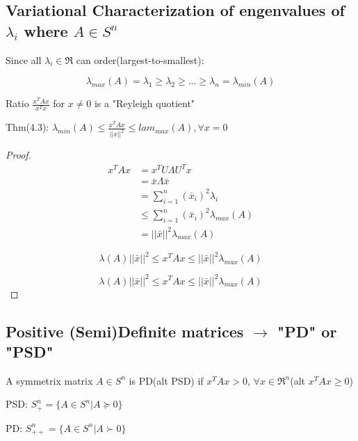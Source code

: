\subsection{Variational Characterization of engenvalues of $\lambda_i$ where $A\in S^n$} 

Since all $\lambda_i \in \Re$ can order(largest-to-smallest):

\begin{equation*}
\lambda_{max}(A) = \lambda_1 \geq \lambda_2 \geq ... \geq \lambda_n =\lambda_{min}(A)
\end{equation*}

Ratio $\frac{x^TAx}{x^Tx}$ for $x\neq 0$ is a "Reyleigh quotient"

Thm(4.3): $\lambda_{min}(A) \leq \frac{x^TAx}{||x||^2}\leq lam
_{max}(A), \forall x = 0$


\begin{proof}
	\begin{align*}
	x^TAx &= x^TU\Lambda U^Tx\\
	&= \bar{x}\Lambda\bar{x}\\
	&= \sum^n_{i=1}(\bar{x}_i)^2\lambda_i\\
	&\leq \sum^n_{i=1}(\bar{x}_i)^2\lambda_{max}(A)\\
	&= ||\bar{x}||^2\lambda_{max}(A)
	\end{align*}
	
	\begin{equation*}
	\lambda(A)||\bar{x}||^2 \leq x^TAx \leq ||\bar{x}||^2\lambda_{max}(A)
	\end{equation*}
	
	\begin{equation*}
	\lambda(A)||\bar{x}||^2 \leq x^TAx \leq ||\bar{x}||^2\lambda_{max}(A)
	\end{equation*}
\end{proof}


\subsection{Positive (Semi)Definite matrices $\rightarrow$ "PD" or "PSD"}

\begin{definition}
	A symmetrix matrix $A\in S^n$ is PD(alt PSD) if $x^TAx > 0$, $\forall x\in \Re^n$(alt $x^TAx\geq 0$)
\end{definition}

PSD: $S^n_{+} = \{A\in S^n | A\succeq 0\}$

PD: $S^n_{++} = \{A\in S^n | A\succ 0\}$


